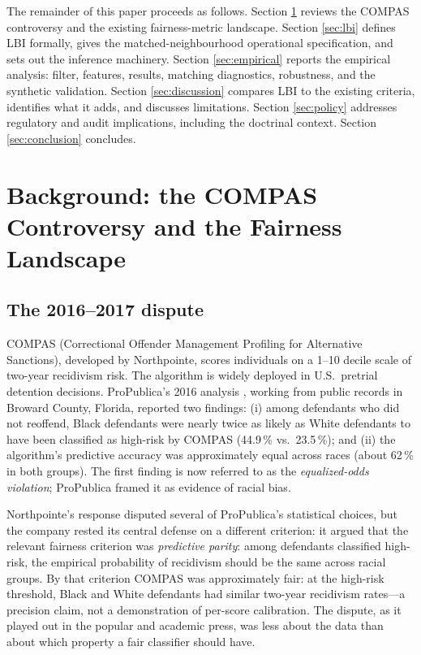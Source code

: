 \documentclass[11pt]{article}
\begin{document}
The remainder of this paper proceeds as follows. Section
\ref{sec:background} reviews the COMPAS controversy and the existing
fairness-metric landscape. Section \ref{sec:lbi} defines LBI formally,
gives the matched-neighbourhood operational specification, and sets
out the inference machinery. Section \ref{sec:empirical} reports the
empirical analysis: filter, features, results, matching diagnostics,
robustness, and the synthetic validation. Section
\ref{sec:discussion} compares LBI to the existing criteria, identifies
what it adds, and discusses limitations. Section \ref{sec:policy}
addresses regulatory and audit implications, including the doctrinal
context. Section \ref{sec:conclusion} concludes.

\section{Background: the COMPAS Controversy and the Fairness Landscape}
\label{sec:background}

\subsection{The 2016--2017 dispute}

COMPAS (Correctional Offender Management Profiling for Alternative
Sanctions), developed by Northpointe, scores individuals on a 1--10
decile scale of two-year recidivism risk. The algorithm is widely
deployed in U.S.\ pretrial detention decisions. ProPublica's 2016
analysis \citep{angwin2016}, working from public records in Broward
County, Florida, reported two findings: (i) among defendants who did
not reoffend, Black defendants were nearly twice as likely as
White defendants to have been classified as high-risk by COMPAS
(44.9\,\% vs.\ 23.5\,\%); and
(ii) the algorithm's predictive accuracy was approximately equal
across races (about 62\,\% in both groups). The first finding is now
referred to as the \emph{equalized-odds violation}; ProPublica framed
it as evidence of racial bias.

Northpointe's response \citep{dieterich2016} disputed several of
ProPublica's statistical choices, but the company rested its central
defense on a different criterion: it argued that the relevant fairness
criterion was \emph{predictive parity}: among defendants classified
high-risk, the empirical probability of recidivism should be the same
across racial groups. By that criterion COMPAS was approximately fair:
at the high-risk threshold, Black and White defendants had similar
two-year recidivism rates---a precision claim, not a demonstration of
per-score calibration. The dispute, as it played out in the popular and academic
press, was less about the data than about which property a fair
classifier should have.
\end{document}
